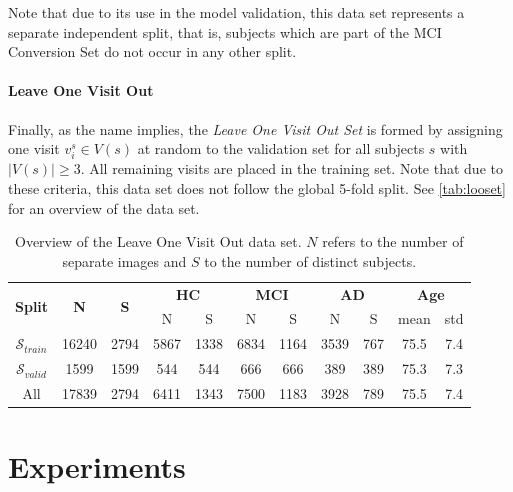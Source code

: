 Note that due to its use in the model validation, this data set represents a separate independent split, that is, subjects which are part of the MCI Conversion Set do not occur in any other split.

\subsubsection*{Leave One Visit Out} \label{sec:datloo}
Finally, as the name implies, the \textit{Leave One Visit Out Set} is formed by assigning one visit $v^s_i \in V(s)$ at random to the validation set for all subjects $s$ with $ | V(s) | \ge 3 $. All remaining visits are placed in the training set. Note that due to these criteria, this data set does not follow the global 5-fold split. See \autoref{tab:looset} for an overview of the data set.

\begin{table}[h]
	\begin{center}
		\begin{tabular}{c c c c c c c c c c c}
			\toprule
			\multirow{2}{*}{\bfseries Split} & 
			\multirow{2}{*}{\bfseries N} & 
			\multirow{2}{*}{\bfseries S} & 
			\multicolumn{2}{c}{\bfseries HC} & 
			\multicolumn{2}{c}{\bfseries MCI} & 
			\multicolumn{2}{c}{\bfseries AD} &
			\multicolumn{2}{c}{\bfseries Age} \\
			\cmidrule(lr){4-5}
			\cmidrule(lr){6-7}
			\cmidrule(lr){8-9}
			\cmidrule(lr){10-11} 
			& & & N & S & N & S & N & S & mean & std \\ 
			\cmidrule(lr){1-11}
			$\mathcal{S}_{train}$ & 16240 & 2794 & 5867 & 1338 & 6834 & 1164 & 3539 & 767 & 75.5 & 7.4 \\
			$\mathcal{S}_{valid}$ &  1599 & 1599 &  544 &  544 &  666 &  666 &  389 & 389 & 75.3 & 7.3 \\
			\cmidrule(lr){1-11}
			All                   & 17839 & 2794 & 6411 & 1343 & 7500 & 1183 & 3928 & 789 & 75.5 & 7.4 \\
			\bottomrule
		\end{tabular}
		\caption{Overview of the Leave One Visit Out data set. $N$ refers to the number of separate images and $S$ to the number of distinct subjects.}
		\label{tab:looset}
	\end{center}
\end{table}

\chapter{Experiments}

